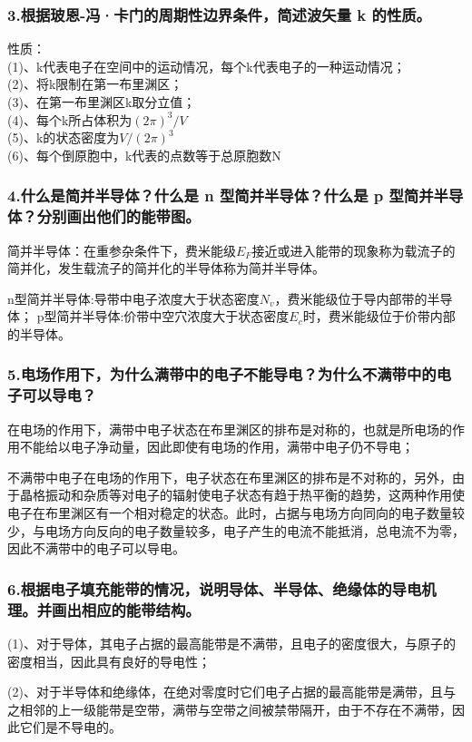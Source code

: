 \documentclass[cn,11pt]{elegantbook}
\begin{document}
\subsubsection*{3.根据玻恩-冯·卡门的周期性边界条件，简述波矢量 k 的性质。}
性质：\\
(1)、k代表电子在空间中的运动情况，每个k代表电子的一种运动情况；\\
(2)、将k限制在第一布里渊区；\\
(3)、在第一布里渊区k取分立值；\\
(4)、每个k所占体积为$(2\pi)^{3}/V$\\
(5)、k的状态密度为$V/(2\pi)^{3}$\\
(6)、每个倒原胞中，k代表的点数等于总原胞数N
\subsubsection*{4.什么是简并半导体？什么是 n 型简并半导体？什么是 p 型简并半导体？分别画出他们的能带图。}
简并半导体：在重参杂条件下，费米能级$E_{F}$接近或进入能带的现象称为载流子的简并化，发生载流子的简并化的半导体称为简并半导体。

n型简并半导体:导带中电子浓度大于状态密度$N_{v}$，费米能级位于导内部带的半导体；
p型简并半导体:价带中空穴浓度大于状态密度$E_{c}$时，费米能级位于价带内部的半导体。
\subsubsection*{5.电场作用下，为什么满带中的电子不能导电？为什么不满带中的电子可以导电？}
在电场的作用下，满带中电子状态在布里渊区的排布是对称的，也就是所电场的作用不能给以电子净动量，因此即使有电场的作用，满带中电子仍不导电；

不满带中电子在电场的作用下，电子状态在布里渊区的排布是不对称的，另外，由于晶格振动和杂质等对电子的辐射使电子状态有趋于热平衡的趋势，这两种作用使电子在布里渊区有一个相对稳定的状态。此时，占据与电场方向同向的电子数量较少，与电场方向反向的电子数量较多，电子产生的电流不能抵消，总电流不为零，因此不满带中的电子可以导电。
\subsubsection*{6.根据电子填充能带的情况，说明导体、半导体、绝缘体的导电机理。并画出相应的能带结构。}
(1)、对于导体，其电子占据的最高能带是不满带，且电子的密度很大，与原子的密度相当，因此具有良好的导电性；

(2)、对于半导体和绝缘体，在绝对零度时它们电子占据的最高能带是满带，且与之相邻的上一级能带是空带，满带与空带之间被禁带隔开，由于不存在不满带，因此它们是不导电的。
\end{document}
